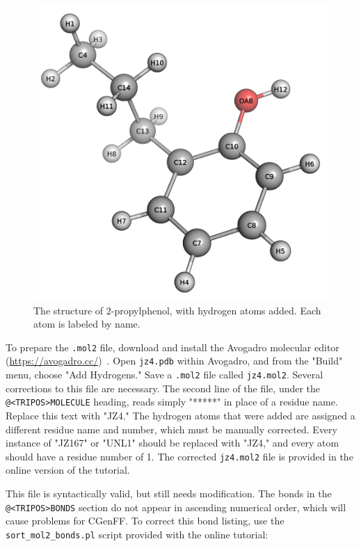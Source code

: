 \documentclass[9pt,tutorial,pubversion]{livecoms}
\begin{document}
\begin{figure}[h!]
\centering
\includegraphics{jz4}
\caption{The structure of 2-propylphenol, with hydrogen atoms added. Each atom is labeled by name.}
\label{jz4_fig}
\end{figure}

To prepare the \texttt{.mol2} file, download and install the Avogadro molecular editor (\url{https://avogadro.cc/})~\cite{Hanwell2012}. Open \texttt{jz4.pdb} within Avogadro, and from the "Build" menu, choose "Add Hydrogens." Save a \texttt{.mol2} file called \texttt{jz4.mol2}. Several corrections to this file are necessary. The second line of the file, under the \texttt{@<TRIPOS>MOLECULE} heading, reads simply "*****" in place of a residue name. Replace this text with "JZ4." The hydrogen atoms that were added are assigned a different residue name and number, which must be manually corrected. Every instance of "JZ167" or "UNL1" should be replaced with "JZ4," and every atom should have a residue number of 1. The corrected \texttt{jz4.mol2} file is provided in the online version of the tutorial.

This file is syntactically valid, but still needs modification. The bonds in the \texttt{@<TRIPOS>BONDS} section do not appear in ascending numerical order, which will cause problems for CGenFF. To correct this bond listing, use the \texttt{sort\_mol2\_bonds.pl} script provided with the online tutorial:
\end{document}
